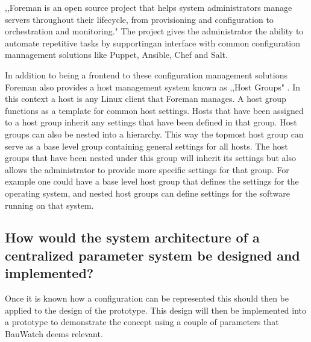 ,,Foreman is an open source project that helps system administrators manage servers throughout their lifecycle, from provisioning and configuration to orchestration and monitoring." \cite{what_is_foreman}
The project gives the administrator the ability to automate repetitive tasks by supportingan interface with common configuration mannagement solutions like Puppet, Ansible, Chef and Salt.

In addition to being a frontend to these configuration management solutions Foreman also provides a host management system known as ,,Host Groups" \cite{foreman_hostgroups}. In this context a host is any Linux client that Foreman manages.
A host group functions as a template for common host settings.
Hosts that have been assigned to a host group inherit any settings that have been defined in that group.
Host groups can also be nested into a hierarchy.
This way the topmost host group can serve as a base level group containing general settings for all hosts.
The host groups that have been nested under this group will inherit its settings but also allows the administrator to provide more specific settings for that group.
For example one could have a base level host group that defines the settings for the operating system, and nested host groups can define settings for the software running on that system.

\subsection{How would the system architecture of a centralized parameter system be designed and implemented?}
Once it is known how a configuration can be represented this should then be applied to the design of the prototype. This design will then be implemented into a
prototype to demonstrate the concept using a couple of parameters that BauWatch deems relevant.

